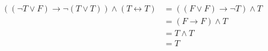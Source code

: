 \documentclass[preview,border=4pt]{standalone}
\begin{document}
\[
\begin{aligned}
    ((\neg T \lor F) \rightarrow \neg(T \lor T)) \land (T \leftrightarrow T)
      &= ((F \lor F) \rightarrow \neg T) \land T\\
      &= (F \rightarrow F) \land T\\
      &= T \land T\\
      &= T
  \end{aligned}
\]
\end{document}
